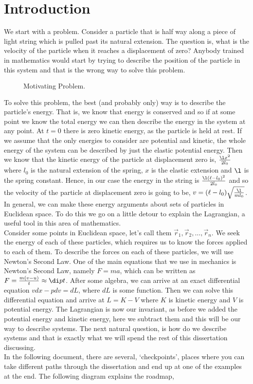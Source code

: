 
\section{Introduction}

We start with a problem. Consider a particle that is half way along a piece of light string which is pulled past its natural extension. The question is, what is the velocity of the particle when it reaches a displacement of zero? Anybody trained in mathematics would start by trying to describe the position of the particle in this system and that is the wrong way to solve this problem.\\

\begin{figure}[!ht]
\centering
\resizebox{0.2\textwidth}{!}{}
\caption{Motivating Problem.}
\end{figure}

\noindent
To solve this problem, the best (and probably only) way is to describe the particle's energy. That is, we know that energy is conserved and so if at some point we know the total energy we can then describe the energy in the system at any point. At $t = 0$ there is zero kinetic energy, as the particle is held at rest. If we assume that the only energies to consider are potential and kinetic, the whole energy of the system can be described by just the elastic potential energy. Then we know that the kinetic energy of the particle at displacement zero is, $\frac{\l x^2}{2l_0}$ where $l_0$ is the natural extension of the spring, $x$ is the elastic extension and $\l$ is the spring constant. Hence, in our case the energy in the string is $\frac{\l (\ell - l_0)^2}{2l_0}$ and so the velocity of the particle at displacement zero is going to be, $v = (\ell - l_0)\sqrt{\frac{\l}{ml_0}}$. In general, we can make these energy arguments about sets of particles in Euclidean space. To do this we go on a little detour to explain the Lagrangian, a useful tool in this area of mathematics.\\

\noindent
Consider some points in Euclidean space, let's call them $\vec r_1, \vec r_2, \dots, \vec r_n$. We seek the energy of each of these particles, which requires us to know the forces applied to each of them. To describe the forces on each of these particles, we will use Newton's Second Law. One of the main equations that we use in mechanics is Newton's Second Law, namely $F = ma$, which can be written as $F = \frac{m(v - u)}{t} \approx \di p t$. After some algebra, we can arrive at an exact differential equation $vdx - pdv = dL$, where $dL$ is some function. Then we can solve this differential equation and arrive at $L = K - V$ where $K$ is kinetic energy and $V$ is potential energy. The Lagrangian is now our invariant, as before we added the potential energy and kinetic energy, here we subtract them and this will be our way to describe systems. The next natural question, is how do we describe systems and that is exactly what we will spend the rest of this dissertation discussing.\\

\noindent
In the following document, there are several, `checkpoints', places where you can take different paths through the dissertation and end up at one of the examples at the end. The following diagram explains the roadmap,
